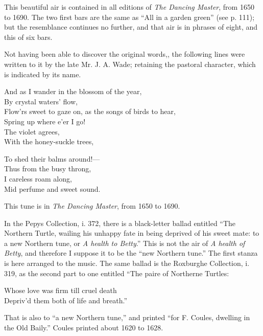 {\small
This beautiful air is contained in all editions of \textit{The Dancing Master}, from
1650 to 1690. The two first bars are the same as “All in a garden green” (see
p. 111); but the resemblance continues no further, and that air is in phrases of
eight, and this of six bars.

Not having been able to discover the original words,, the following lines were
written to it by the late Mr. J. A. Wade; retaining the pastoral character, which
is indicated by its name.
}%



\pagebreak

\settowidth{\versewidth}{Flow’rs sweet to gaze on, as the songs of birds to hear,}
\begin{dcverse}
\begin{patverse}
And as I wander in the blossom of the year,\\
By crystal waters’ flow,\\
Flow’rs sweet to gaze on, as the songs of birds to hear,\\
Spring up where e'er I go!	 \\
The violet agrees,\\
With the honey-suckle trees,
\end{patverse}

\columnbreak

\begin{patverse}
To shed their balms around!—\\
Thus from the busy throng,\\
I careless roam along,\\
Mid perfume and sweet sound.
\end{patverse}
\end{dcverse}


This tune is in \textit{The Dancing Master}, from 1650 to 1690.

In the Pepys Collection, i. 372, there is a black-letter ballad entitled “The
Northern Turtle, wailing his unhappy fate in being deprived of his sweet mate:
to a new Northern tune, or \textit{A health to Betty}.” This is not the air of \textit{A health of
Betty}, and therefore I suppose it to be the “new Northern tune.” The first
stanza is here arranged to the music. The same ballad is the Roxburghe Collection, 
i. 319, as the second part to one entitled “The paire of Northerne Turtles:
\settowidth{\versewidth}{Whose love was firm till cruel death}
\begin{scverse}Whose love was firm till cruel death\\
Depriv’d them both of life and breath.”
\end{scverse}
That is also to “a new Northern tune,” and printed “for F. Coules, dwelling in
the Old Baily.” Coules printed about 1620 to 1628.

